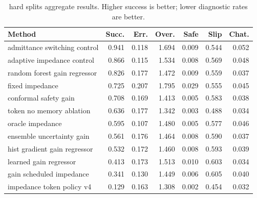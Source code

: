 \begin{table}[t]
\centering
\caption{hard splits aggregate results. Higher success is better; lower diagnostic rates are better.}
\label{tab:hard-aggregate}
\small
\begin{tabular}{lrrrrrr}
\toprule
Method & Succ. & Err. & Over. & Safe & Slip & Chat. \\
\midrule
admittance switching control & 0.941 & 0.118 & 1.694 & 0.009 & 0.544 & 0.052 \\
adaptive impedance control & 0.866 & 0.115 & 1.534 & 0.008 & 0.569 & 0.048 \\
random forest gain regressor & 0.826 & 0.177 & 1.472 & 0.009 & 0.559 & 0.037 \\
fixed impedance & 0.725 & 0.207 & 1.795 & 0.029 & 0.555 & 0.045 \\
conformal safety gain & 0.708 & 0.169 & 1.413 & 0.005 & 0.583 & 0.038 \\
token no memory ablation & 0.636 & 0.177 & 1.342 & 0.003 & 0.488 & 0.034 \\
oracle impedance & 0.595 & 0.107 & 1.480 & 0.005 & 0.577 & 0.046 \\
ensemble uncertainty gain & 0.561 & 0.176 & 1.464 & 0.008 & 0.590 & 0.037 \\
hist gradient gain regressor & 0.532 & 0.172 & 1.460 & 0.008 & 0.593 & 0.039 \\
learned gain regressor & 0.413 & 0.173 & 1.513 & 0.010 & 0.603 & 0.034 \\
gain scheduled impedance & 0.341 & 0.130 & 1.449 & 0.006 & 0.605 & 0.040 \\
impedance token policy v4 & 0.129 & 0.163 & 1.308 & 0.002 & 0.454 & 0.032 \\
\bottomrule
\end{tabular}
\end{table}

